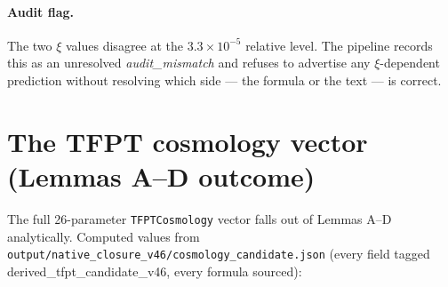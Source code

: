 \documentclass[11pt,a4paper]{article}
\begin{document}
\paragraph{Audit flag.} The two \(\xi\) values disagree at the
\(3.3\times 10^{-5}\) relative level. The pipeline records this as an
unresolved \emph{audit\_mismatch} and refuses to advertise any
\(\xi\)-dependent prediction without resolving which side --- the
formula or the text --- is correct.

\section{The TFPT cosmology vector (Lemmas A--D outcome)}
\label{sec:cosmovec}

The full 26-parameter \texttt{TFPTCosmology} vector falls out of Lemmas
A--D analytically.  Computed values from
\texttt{output/native\_closure\_v46/cosmology\_candidate.json} (every
field tagged \textsf{derived\_tfpt\_candidate\_v46}, every formula
sourced):
\end{document}
